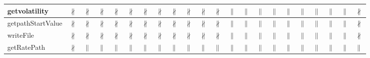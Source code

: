 \documentclass[10pt]{article}
\begin{document}
\begin{longtable}{|l|l|l|l|l|l|l|l|l|l|l|l|l|l|l|l|l|l|l|l|l|l|}
\hline
getvolatility&{\color{BrickRed}$\nparallel$}&{\color{BrickRed}$\nparallel$}&{\color{BrickRed}$\nparallel$}&{\color{BrickRed}$\nparallel$}&{\color{BrickRed}$\nparallel$}&{\color{BrickRed}$\nparallel$}&{\color{BrickRed}$\nparallel$}&{\color{BrickRed}$\nparallel$}&{\color{BrickRed}$\nparallel$}&{\color{BrickRed}$\nparallel$}&{\color{BrickRed}$\nparallel$}&{\color{blue}$\parallel$}&{\color{blue}$\parallel$}&{\color{blue}$\parallel$}&{\color{blue}$\parallel$}&{\color{blue}$\parallel$}&{\color{blue}$\parallel$}&{\color{blue}$\parallel$}&{\color{blue}$\parallel$}&{\color{blue}$\parallel$}&{\color{BrickRed}$\nparallel$}\\
\hline
getpathStartValue&{\color{BrickRed}$\nparallel$}&{\color{BrickRed}$\nparallel$}&{\color{BrickRed}$\nparallel$}&{\color{BrickRed}$\nparallel$}&{\color{BrickRed}$\nparallel$}&{\color{BrickRed}$\nparallel$}&{\color{BrickRed}$\nparallel$}&{\color{BrickRed}$\nparallel$}&{\color{BrickRed}$\nparallel$}&{\color{BrickRed}$\nparallel$}&{\color{BrickRed}$\nparallel$}&{\color{blue}$\parallel$}&{\color{blue}$\parallel$}&{\color{blue}$\parallel$}&{\color{blue}$\parallel$}&{\color{blue}$\parallel$}&{\color{blue}$\parallel$}&{\color{blue}$\parallel$}&{\color{blue}$\parallel$}&{\color{blue}$\parallel$}&{\color{BrickRed}$\nparallel$}\\
\hline
writeFile&{\color{BrickRed}$\nparallel$}&{\color{BrickRed}$\nparallel$}&{\color{BrickRed}$\nparallel$}&{\color{BrickRed}$\nparallel$}&{\color{BrickRed}$\nparallel$}&{\color{BrickRed}$\nparallel$}&{\color{BrickRed}$\nparallel$}&{\color{BrickRed}$\nparallel$}&{\color{BrickRed}$\nparallel$}&{\color{BrickRed}$\nparallel$}&{\color{BrickRed}$\nparallel$}&{\color{blue}$\parallel$}&{\color{blue}$\parallel$}&{\color{blue}$\parallel$}&{\color{blue}$\parallel$}&{\color{blue}$\parallel$}&{\color{blue}$\parallel$}&{\color{blue}$\parallel$}&{\color{blue}$\parallel$}&{\color{blue}$\parallel$}&{\color{BrickRed}$\nparallel$}\\
\hline
getRatePath&{\color{BrickRed}$\nparallel$}&{\color{blue}$\parallel$}&{\color{blue}$\parallel$}&{\color{blue}$\parallel$}&{\color{blue}$\parallel$}&{\color{blue}$\parallel$}&{\color{blue}$\parallel$}&{\color{blue}$\parallel$}&{\color{blue}$\parallel$}&{\color{blue}$\parallel$}&{\color{blue}$\parallel$}&{\color{blue}$\parallel$}&{\color{blue}$\parallel$}&{\color{blue}$\parallel$}&{\color{blue}$\parallel$}&{\color{blue}$\parallel$}&{\color{blue}$\parallel$}&{\color{blue}$\parallel$}&{\color{blue}$\parallel$}&{\color{blue}$\parallel$}&{\color{blue}$\parallel$}\\

\end{longtable}
\end{document}
